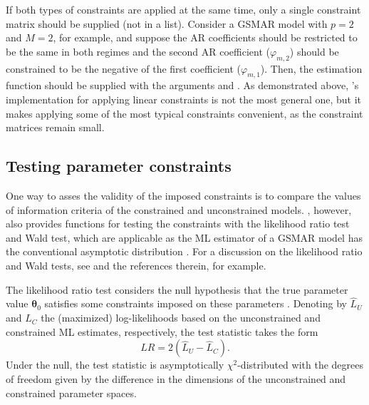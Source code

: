 \documentclass[nojss]{jss} %
\begin{document}
If both types of constraints are applied at the same time, only a single constraint matrix should be supplied (not in a list). Consider a GSMAR model with $p=2$ and $M=2$, for example, and suppose the AR coefficients should be restricted to be the same in both regimes and the second AR coefficient ($\varphi_{m,2}$) should be constrained to be the negative of the first coefficient ($\varphi_{m,1}$). Then, the estimation function should be supplied with the arguments  and . As demonstrated above, 's implementation for applying linear constraints is not the most general one, but it makes applying some of the most typical constraints convenient, as the constraint matrices remain small.


\subsection{Testing parameter constraints}\label{sec:testconst}
One way to asses the validity of the imposed constraints is to compare the values of information criteria of the constrained and unconstrained models. , however, also provides functions for testing the constraints with the likelihood ratio test and Wald test, which are applicable as the ML estimator of a GSMAR model has the conventional asymptotic distribution \cite[as long as the model is correctly specified and one is willing to assume the validity of the required unverified assumptions, see][pp. 254-255, \citealp{Meitz+Preve+Saikkonen:2021}, Theorem 3, and \citealp{Virolainen:2020}, Theorem 2]{Kalliovirta+Meitz+Saikkonen:2015}. For a discussion on the likelihood ratio and Wald tests, see \citet{Buse:1982} and the references therein, for example.

The likelihood ratio test considers the null hypothesis that the true parameter value $\boldsymbol{\theta}_0$ satisfies some constraints imposed on these parameters \cite[such that the constrained parameter space is a subset of the parameter space, which is presented in][Section 2.2 for the GSMAR models]{Virolainen:2020}. Denoting by $\hat{L}_U$ and $\hat{L}_C$ the (maximized) log-likelihoods based on the unconstrained and constrained ML estimates, respectively, the test statistic takes the form
\begin{equation}
LR=2(\hat{L}_U - \hat{L}_C).
\end{equation}
Under the null, the test statistic is asymptotically $\chi^2$-distributed with the degrees of freedom given by the difference in the dimensions of the unconstrained and constrained parameter spaces.
\end{document}
